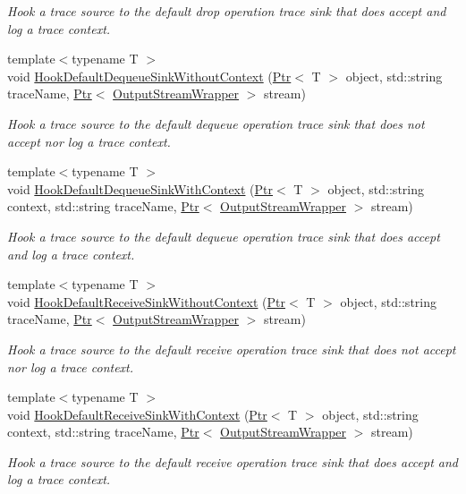 \begin{DoxyCompactItemize}
\begin{DoxyCompactList}\small\item\em Hook a trace source to the default drop operation trace sink that does accept and log a trace context. \end{DoxyCompactList}\item 
{\footnotesize template$<$typename T $>$ }\\void \hyperlink{classns3_1_1AsciiTraceHelper_aa243f364282ccf172881cde50cfaa4dd}{Hook\+Default\+Dequeue\+Sink\+Without\+Context} (\hyperlink{classns3_1_1Ptr}{Ptr}$<$ T $>$ object, std\+::string trace\+Name, \hyperlink{classns3_1_1Ptr}{Ptr}$<$ \hyperlink{classns3_1_1OutputStreamWrapper}{Output\+Stream\+Wrapper} $>$ stream)
\begin{DoxyCompactList}\small\item\em Hook a trace source to the default dequeue operation trace sink that does not accept nor log a trace context. \end{DoxyCompactList}\item 
{\footnotesize template$<$typename T $>$ }\\void \hyperlink{classns3_1_1AsciiTraceHelper_a4346fd3ce1f45b1227fb8fc65d739494}{Hook\+Default\+Dequeue\+Sink\+With\+Context} (\hyperlink{classns3_1_1Ptr}{Ptr}$<$ T $>$ object, std\+::string context, std\+::string trace\+Name, \hyperlink{classns3_1_1Ptr}{Ptr}$<$ \hyperlink{classns3_1_1OutputStreamWrapper}{Output\+Stream\+Wrapper} $>$ stream)
\begin{DoxyCompactList}\small\item\em Hook a trace source to the default dequeue operation trace sink that does accept and log a trace context. \end{DoxyCompactList}\item 
{\footnotesize template$<$typename T $>$ }\\void \hyperlink{classns3_1_1AsciiTraceHelper_a7fff46d65f55f3b405cb40c2de88e147}{Hook\+Default\+Receive\+Sink\+Without\+Context} (\hyperlink{classns3_1_1Ptr}{Ptr}$<$ T $>$ object, std\+::string trace\+Name, \hyperlink{classns3_1_1Ptr}{Ptr}$<$ \hyperlink{classns3_1_1OutputStreamWrapper}{Output\+Stream\+Wrapper} $>$ stream)
\begin{DoxyCompactList}\small\item\em Hook a trace source to the default receive operation trace sink that does not accept nor log a trace context. \end{DoxyCompactList}\item 
{\footnotesize template$<$typename T $>$ }\\void \hyperlink{classns3_1_1AsciiTraceHelper_a6e3da7ee89922529f70641dab4934cda}{Hook\+Default\+Receive\+Sink\+With\+Context} (\hyperlink{classns3_1_1Ptr}{Ptr}$<$ T $>$ object, std\+::string context, std\+::string trace\+Name, \hyperlink{classns3_1_1Ptr}{Ptr}$<$ \hyperlink{classns3_1_1OutputStreamWrapper}{Output\+Stream\+Wrapper} $>$ stream)
\begin{DoxyCompactList}\small\item\em Hook a trace source to the default receive operation trace sink that does accept and log a trace context. \end{DoxyCompactList}\end{DoxyCompactItemize}
